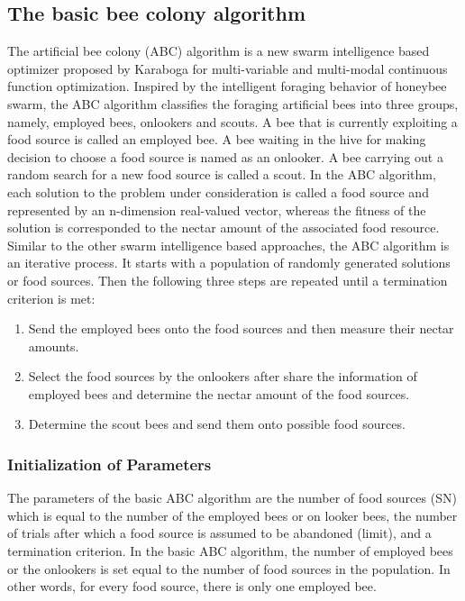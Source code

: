 \documentclass[pdftex,11pt]{article}
\begin{document}
\subsection{The basic bee colony algorithm}
The artificial bee colony (ABC) algorithm is a new swarm intelligence based optimizer proposed by Karaboga for multi-variable and multi-modal continuous function optimization. Inspired by the intelligent foraging behavior of honeybee swarm, the ABC algorithm classifies the foraging artificial bees into three groups, namely, employed bees, onlookers and scouts. A bee that is currently exploiting a food source is called an employed bee. A bee waiting in the hive for making decision to choose a food source is named as an onlooker. A bee carrying out a random search for a new food source is called a scout. In the ABC algorithm, each solution to the problem under consideration is called a food source and represented by an n-dimension real-valued vector, whereas the fitness of the solution is corresponded to the nectar amount of the associated food resource. Similar to the other swarm intelligence based approaches, the ABC algorithm is an iterative process. It starts with a population of randomly generated solutions or food sources. Then the following three steps are repeated until a termination criterion is met:

\begin{enumerate}
\item Send the employed bees onto the food sources and then measure their nectar amounts.
\item Select the food sources by the onlookers after share the information of employed bees and determine the nectar amount of the food sources.
\item Determine the scout bees and send them onto possible food sources.
\end{enumerate}
\subsubsection{Initialization of Parameters}
The parameters of the basic ABC algorithm are the number of food sources (SN) which is equal to the number of the employed bees or on looker bees, the number of trials after which a food source is assumed to be abandoned (limit), and a termination criterion. In the basic ABC algorithm, the number of employed bees or the onlookers is set equal to the number of food sources in the population. In other words, for every food source, there is only one employed bee.
\end{document}
